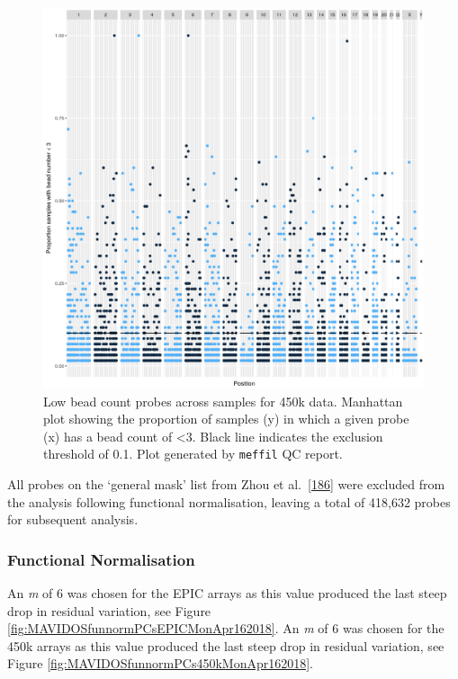 \documentclass[
]{book}
\begin{document}
\begin{figure}

{\centering \includegraphics[width=0.8\linewidth]{figs/MAVIDOSqc450kbeadNumAcross} 

}

\caption{Low bead count probes across samples for 450k data. Manhattan plot showing the proportion of samples (y) in which a given probe (x) has a bead count of \textless3. Black line indicates the exclusion threshold of 0.1. Plot generated by \texttt{meffil} QC report.}\label{fig:MAVIDOSqc450kbeadNumAcross}
\end{figure}



All probes on the `general mask' list from Zhou et al.~{[}\protect\hyperlink{ref-Zhou2017}{186}{]} were excluded from the analysis following functional normalisation, leaving a total of 418,632 probes for subsequent analysis.

\hypertarget{functional-normalisation-1}{%
\subsubsection{Functional Normalisation}\label{functional-normalisation-1}}

An \emph{m} of 6 was chosen for the EPIC arrays as this value produced the last steep drop in residual variation, see Figure \ref{fig:MAVIDOSfunnormPCsEPICMonApr162018}.
An \emph{m} of 6 was chosen for the 450k arrays as this value produced the last steep drop in residual variation, see Figure \ref{fig:MAVIDOSfunnormPCs450kMonApr162018}.
\end{document}
